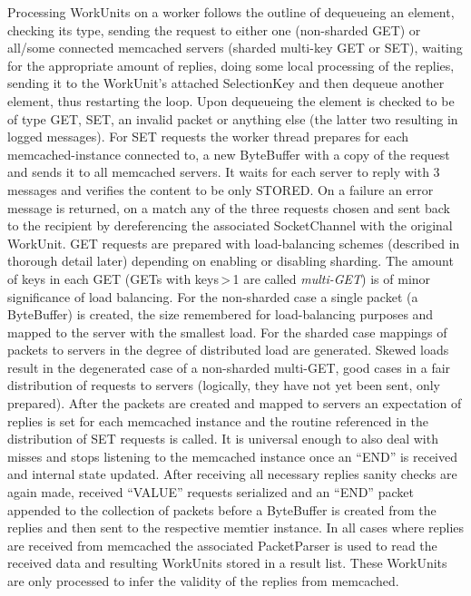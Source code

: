         Processing WorkUnits on a worker follows the outline of dequeueing an element, checking its type, sending the
        request to either one (non-sharded GET) or all/some connected memcached servers (sharded multi-key GET or SET),
        waiting for the appropriate amount of replies, doing some local processing of the replies, sending it to the
        WorkUnit's attached SelectionKey and then dequeue another element, thus restarting the loop. Upon dequeueing the
        element is checked to be of type GET, SET, an invalid packet or anything else (the latter two resulting in
        logged messages). For SET requests the worker thread prepares for each memcached-instance connected to, a new
        ByteBuffer with a copy of the request and sends it to all memcached servers. It waits for each server to reply
        with 3 messages and verifies the content to be only STORED. On a failure an error message is returned, on a
        match any of the three requests chosen and sent back to the recipient by dereferencing the associated
        SocketChannel with the original WorkUnit. GET requests are prepared with load-balancing
        schemes (described in thorough detail later) depending on enabling or disabling sharding. The amount of keys in
        each GET (GETs with keys\,>\,1 are called \emph{multi-GET}) is of minor significance of load balancing. For the
        non-sharded case a single packet (a ByteBuffer) is created, the size remembered for load-balancing purposes and
        mapped to the server with the smallest load. For the sharded case mappings of packets to servers in the degree
        of distributed load are generated. Skewed loads result in the degenerated case of a non-sharded multi-GET, good
        cases in a fair distribution of requests to servers (logically, they have not yet been sent, only prepared).
        After the packets are created and mapped to servers an expectation of replies is set for each memcached instance
        and the routine referenced in the distribution of SET requests is called. It is universal enough to also deal
        with misses and stops listening to the memcached instance once an ``END'' is received and internal state
        updated. After receiving all necessary replies sanity checks are again made, received ``VALUE'' requests
        serialized and an ``END'' packet appended to the collection of packets before a ByteBuffer is created from the
        replies and then sent to the respective memtier instance. In all cases where replies are received from memcached
        the associated PacketParser is used to read the received data and resulting WorkUnits stored in a result list.
        These WorkUnits are only processed to infer the validity of the replies from memcached.


